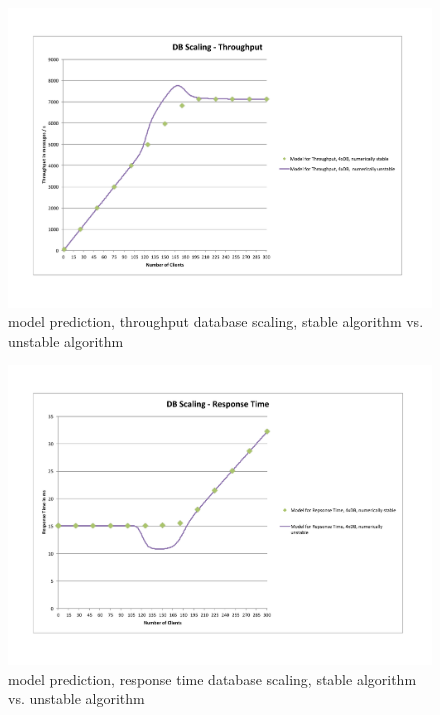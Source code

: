 \documentclass[a4paper]{article}
\begin{document}
\begin{landscape}
\begin{figure}[H]
	\begin{center}
    \includegraphics[scale=0.7, trim = 23mm 28mm 24mm 24mm, clip]{measurements_increase_load/tp_db_scaling_stable.pdf}
  \end{center}
  \caption{model prediction, throughput database scaling, stable algorithm vs. unstable algorithm}
  \label{fig:tp-db-scale-stable}
\end{figure}

\begin{figure}[H]
	\begin{center}
    \includegraphics[scale=0.7, trim = 23mm 28mm 24mm 24mm, clip]{measurements_increase_load/rt_db_scaling_stable.pdf}
  \end{center}
  \caption{model prediction, response time database scaling, stable algorithm vs. unstable algorithm}
  \label{fig:rt-db-scale-stable}
\end{figure}


\end{landscape}
\end{document}
